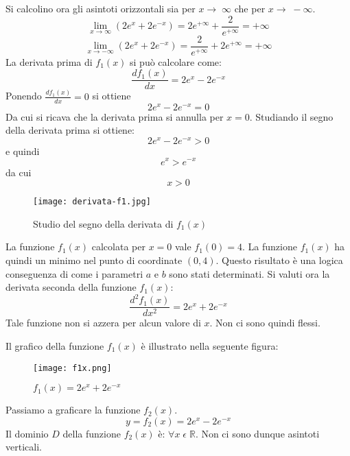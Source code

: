 \documentclass[a4paper,12pt]{article}
\begin{document}
\begin{enumerate}
Si calcolino ora gli asintoti orizzontali sia per $x \rightarrow\;\infty$ che per $x \rightarrow\;-\infty$.
\begin{equation}
  \lim_{x\rightarrow \infty}(2e^x+2e^{-x})=2e^{+\infty}+\frac{2}{e^{+\infty}}=+\infty
\end{equation}
\begin{equation}
  \lim_{x\rightarrow- \infty}(2e^x+2e^{-x})=\frac{2}{e^{+\infty}}+2e^{+\infty}=+\infty
\end{equation}
La derivata prima di $f_1(x)$ si può calcolare come:
\begin{equation}\frac{df_1(x)}{dx}=2e^x-2e^{-x}\end{equation}
Ponendo $\frac{df_1(x)}{dx}=0$ si ottiene
\begin{equation}2e^x-2e^{-x}=0\end{equation}
Da cui si ricava che la derivata prima si annulla per $x=0$.
Studiando il segno della derivata prima si ottiene:
\begin{equation}2e^x-2e^{-x}>0\end{equation}
e quindi
\begin{equation}e^x> e^{-x}\end{equation}
da cui
\begin{equation}x>0\end{equation}
\begin{figure}[H]
\centering
\texttt{[image: derivata-f1.jpg]}
\caption {Studio del segno della derivata di $f_1(x)$}
\end{figure}
La funzione $f_1(x)$ calcolata per $x=0$ vale $f_1(0)=4$.
La funzione $f_1(x)$ ha quindi un minimo nel punto di coordinate $(0,4)$. Questo risultato è una logica conseguenza  di come i parametri $a$ e $b$ sono stati determinati. 
Si valuti ora la derivata seconda della funzione $f_1(x)$:
\begin{equation} \frac{d^2f_1(x)}{dx^2}=2e^x+2e^{-x}\end{equation}
Tale funzione non si azzera per alcun valore di $x$. Non ci sono quindi flessi.

Il grafico della funzione $f_1(x)$ è illustrato nella seguente figura:

\begin{figure}[H]
\centering
\texttt{[image: f1x.png]}
\caption {$f_1(x)=2e^x+2e^{-x}$}
\label{$f_1(x)$}
\end{figure}

Passiamo  a graficare la funzione $f_2(x)$.
\begin{equation}y=f_2(x)=2e^x-2e^{-x}\end{equation}
Il dominio $D$ della funzione $f_2(x)$ è:  $\forall x\; \epsilon\; \mathbb{R}$. Non ci sono dunque asintoti verticali.


\end{enumerate}
\end{document}
